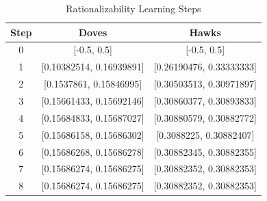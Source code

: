 \documentclass[12pt]{article}
\begin{document}
\begin{table}[htbp]
    \centering
    \caption{Rationalizability Learning Steps}
    \label{table1}
    \begin{tabular}{|c|c|c|}
    \hline
    \textbf{Step} & \textbf{Doves} & \textbf{Hawks} \\ \hline
    0             & [-0.5, 0.5]      & [-0.5, 0.5]      \\ 
    1             & [0.10382514, 0.16939891]     & [0.26190476, 0.33333333]     \\ 
    2             & [0.1537861, 0.15846995]     & [0.30503513, 0.30971897]     \\ 
    3             & [0.15661433, 0.15692146]     & [0.30860377, 0.30893833]     \\ 
    4             & [0.15684833, 0.15687027]     & [0.30880579, 0.30882772]     \\ 
    5             & [0.15686158, 0.15686302]     & [0.3088225, 0.30882407]     \\ 
    6             & [0.15686268, 0.15686278]     & [0.30882345, 0.30882355]\\
    7             & [0.15686274, 0.15686275]     & [0.30882352, 0.30882353]\\
    8             & [0.15686274, 0.15686275]     & [0.30882352, 0.30882353]     \\ \hline
    \end{tabular}
    \end{table}
\end{document}
